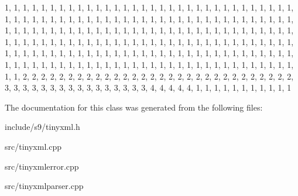 \begin{DoxyCode}
 
{
    
        1,  1,  1,  1,  1,  1,  1,  1,  1,  1,  1,  1,  1,  1,  1,  1,  
        1,  1,  1,  1,  1,  1,  1,  1,  1,  1,  1,  1,  1,  1,  1,  1,  
        1,  1,  1,  1,  1,  1,  1,  1,  1,  1,  1,  1,  1,  1,  1,  1,  
        1,  1,  1,  1,  1,  1,  1,  1,  1,  1,  1,  1,  1,  1,  1,  1,  
        1,  1,  1,  1,  1,  1,  1,  1,  1,  1,  1,  1,  1,  1,  1,  1,  
        1,  1,  1,  1,  1,  1,  1,  1,  1,  1,  1,  1,  1,  1,  1,  1,  
        1,  1,  1,  1,  1,  1,  1,  1,  1,  1,  1,  1,  1,  1,  1,  1,  
        1,  1,  1,  1,  1,  1,  1,  1,  1,  1,  1,  1,  1,  1,  1,  1,  
        1,  1,  1,  1,  1,  1,  1,  1,  1,  1,  1,  1,  1,  1,  1,  1,  
        1,  1,  1,  1,  1,  1,  1,  1,  1,  1,  1,  1,  1,  1,  1,  1,  
        1,  1,  1,  1,  1,  1,  1,  1,  1,  1,  1,  1,  1,  1,  1,  1,  
        1,  1,  1,  1,  1,  1,  1,  1,  1,  1,  1,  1,  1,  1,  1,  1,  
        1,  1,  2,  2,  2,  2,  2,  2,  2,  2,  2,  2,  2,  2,  2,  2,  
        2,  2,  2,  2,  2,  2,  2,  2,  2,  2,  2,  2,  2,  2,  2,  2,  
        3,  3,  3,  3,  3,  3,  3,  3,  3,  3,  3,  3,  3,  3,  3,  3,  
        4,  4,  4,  4,  4,  1,  1,  1,  1,  1,  1,  1,  1,  1,  1,  1   
}
\end{DoxyCode}


\-The documentation for this class was generated from the following files\-:\begin{DoxyCompactItemize}
\item 
include/s9/tinyxml.\-h\item 
src/tinyxml.\-cpp\item 
src/tinyxmlerror.\-cpp\item 
src/tinyxmlparser.\-cpp\end{DoxyCompactItemize}
